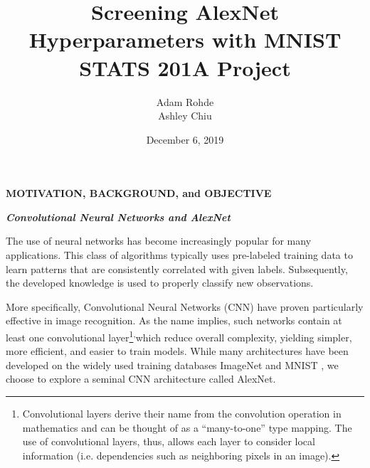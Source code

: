\documentclass[12pt]{article}
\title{\textbf{Screening AlexNet Hyperparameters with MNIST \\ \vspace{12pt} \large{STATS 201A Project}}}
\author{Adam Rohde \\ Ashley Chiu}
\date{December 6, 2019}
\begin{document}
\maketitle
\thispagestyle{empty}

\clearpage
\newpage



{\noindent \sc \textbf{MOTIVATION, BACKGROUND, and OBJECTIVE}}

\vspace{.5pc}
\noindent \textbf{\textit{Convolutional Neural Networks and AlexNet}}
\vspace{.1pc}

The use of neural networks has become increasingly popular for many applications. This class of algorithms typically uses pre-labeled training data to learn patterns that are consistently correlated with given labels. Subsequently, the developed knowledge is used to properly classify new observations. 

More specifically, Convolutional Neural Networks (CNN) have proven particularly effective in image recognition. As the name implies, such networks contain at least one convolutional layer\footnote{Convolutional layers derive their name from the convolution operation in mathematics and can be thought of as a “many-to-one” type mapping. The use of convolutional layers, thus, allows each layer to consider local information (i.e. dependencies such as neighboring pixels in an image).}\textsuperscript{,}which reduce overall complexity, yielding simpler, more efficient, and easier to train models. While many architectures have been developed on the widely used training databases ImageNet and MNIST , we choose to explore a seminal CNN architecture called AlexNet.
\end{document}
